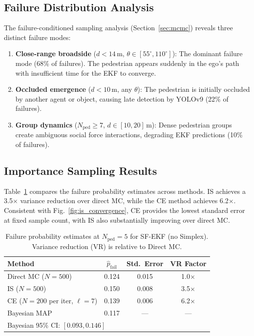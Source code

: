 \documentclass[conference]{IEEEtran}
\begin{document}
\subsection{Failure Distribution Analysis}

The failure-conditioned sampling analysis (Section~\ref{sec:mcmc}) reveals three distinct failure modes:
\begin{enumerate}
    \item \textbf{Close-range broadside} ($d < 14$\,m, $\theta \in [55^\circ, 110^\circ]$): The dominant failure mode (68\% of failures). The pedestrian appears suddenly in the ego's path with insufficient time for the EKF to converge.
    \item \textbf{Occluded emergence} ($d < 10$\,m, any $\theta$): The pedestrian is initially occluded by another agent or object, causing late detection by YOLOv9 (22\% of failures).
    \item \textbf{Group dynamics} ($N_{\text{ped}} \geq 7$, $d \in [10, 20]$\,m): Dense pedestrian groups create ambiguous social force interactions, degrading EKF predictions (10\% of failures).
\end{enumerate}

\subsection{Importance Sampling Results}

Table~\ref{tab:is_results} compares the failure probability estimates across methods.
IS achieves a 3.5$\times$ variance reduction over direct MC, while the CE method achieves 6.2$\times$.
Consistent with Fig.~\ref{fig:is_convergence}, CE provides the lowest standard error at fixed sample count, with IS also substantially improving over direct MC.

\begin{table}[H]
    \centering
    \caption{Failure probability estimates at $N_{\text{ped}} = 5$ for SF-EKF (no Simplex). Variance reduction (VR) is relative to Direct MC.}
    \label{tab:is_results}
    \renewcommand{\arraystretch}{1.15}
    \begin{tabular}{l c c c}
        \toprule
        \textbf{Method} & $\hat{p}_{\text{fail}}$ & \textbf{Std.\ Error} & \textbf{VR Factor} \\
        \midrule
        Direct MC ($N{=}500$)                    & 0.124 & 0.015 & 1.0$\times$ \\
        IS ($N{=}500$)                           & 0.150 & 0.008 & 3.5$\times$ \\
        CE ($N{=}200$ per iter, $\ell{=}7$)     & 0.139 & 0.006 & 6.2$\times$ \\
        Bayesian MAP                              & 0.117 & --- & --- \\
        \midrule
        \multicolumn{4}{l}{\small Bayesian 95\% CI: $[0.093, 0.146]$} \\
        \bottomrule
    \end{tabular}
\end{table}
\end{document}
